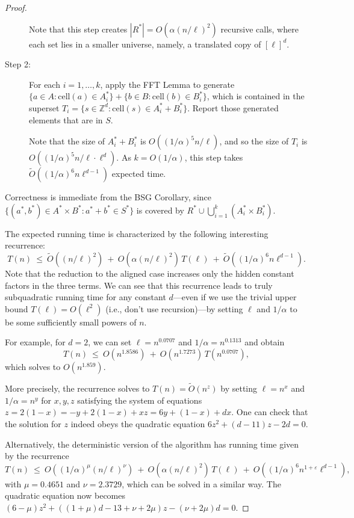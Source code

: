 \documentclass[11pt]{article}
\newtheorem{theorem}{Theorem}[section]
\newcommand{\eps}{\varepsilon}
\newcommand{\Z}{\mathbb{Z}}
\newcommand{\OO}{\widetilde{O}}
\newcommand{\CELL}{\textrm{cell}}
\newcommand{\IGNORE}[1]{}
\begin{document}
\begin{proof}
\begin{description}
Note that
this step creates $|R^*|=O(\alpha(n/\ell)^2)$ recursive calls,
where each set lies in a smaller universe, namely,
a translated copy of $[\ell]^d$.
\item[Step 2:]
For each $i=1,\ldots,k$,
apply the FFT Lemma to generate
$\{a\in A: \CELL(a)\in A_i^*\} + \{b\in B: \CELL(b)\in B_i^*\}$,
which is contained in the
superset $T_i = \{s\in \Z^d: \CELL(s)\in A_i^*+B_i^*\}$.
Report those generated elements that are in $S$.

Note that the size of $A_i^*+B_i^*$ is $O((1/\alpha)^5 n/\ell)$,
and so the size of $T_i$ is $O((1/\alpha)^5 n/\ell\cdot \ell^d)$.
As $k=O(1/\alpha)$, this step takes
$\OO((1/\alpha)^6 n\ell^{d-1})$ expected time.
\end{description}

Correctness is immediate from the BSG Corollary, since
$\{(a^*,b^*)\in A^*\times B^*: a^*+b^*\in S^*\}$ is covered by
$R^*\cup \bigcup_{i=1}^k (A_i^*\times B_i^*)$.

The expected running time is characterized by the following interesting recurrence:
\[ T(n) \:\le\: \OO((n/\ell)^2) \:+\: O(\alpha (n/\ell)^2)\, T(\ell) \:+\:
                 \OO((1/\alpha)^6 n\ell^{d-1}).
\]
Note that the reduction to the aligned case increases only
the hidden constant factors in the three terms.
We can see that this recurrence leads to truly subquadratic
running time for any constant $d$---even if we use the trivial upper bound $T(\ell)=O(\ell^2)$
(i.e., don't use recursion)---by setting $\ell$ and $1/\alpha$ to be some sufficiently small powers of $n$.

For example, for $d=2$, we can set $\ell=n^{0.0707}$ and $1/\alpha=n^{0.1313}$ and obtain
\[ T(n) \:\le\: O(n^{1.8586}) \:+\: O(n^{1.7273})\, T(n^{0.0707}),
\]
which solves to $O(n^{1.859})$.

More precisely, the recurrence solves to $T(n)=\OO(n^z)$
by setting $\ell=n^x$ and $1/\alpha=n^y$ for $x,y,z$ satisfying
the system of equations
$z=2(1-x)=-y+2(1-x)+xz=6y+(1-x)+dx$.  One can check that the
solution for $z$ indeed obeys the quadratic equation
$6z^2+(d-11)z-2d=0$.

\IGNORE{
\begin{theorem}
Alternatively, we can solve the problem in Theorem~\ref{thm-monotone} in
$O(n^{z+o(1)})$ deterministic time where
$z$ is the larger root of
$(6-\mu)z^2 + (d(1+\mu) -13 + \omega + 2\mu)z - d(\omega + 2\mu)=0$.
Here, $\mu=(3-\rho-\omega)/(1-\rho)$, and
$\omega$ and $\rho$ are
the square and rectangular matrix multiplication exponents.
\end{theorem}
\begin{proof}
}

Alternatively, the deterministic version of the algorithm
has running time
given by the recurrence
\[ T(n) \:\le\: O((1/\alpha)^\mu (n/\ell)^\nu) \:+\: O(\alpha (n/\ell)^2)\, T(\ell) \:+\:
                 O((1/\alpha)^6 n^{1+\eps}\ell^{d-1}),
\]
with $\mu=0.4651$ and $\nu=2.3729$,
which can be solved in a similar way.
The quadratic equation now becomes
$(6-\mu)z^2 + ((1+\mu)d -13 + \nu + 2\mu)z - (\nu + 2\mu)d=0$.
\end{proof}
\end{document}
